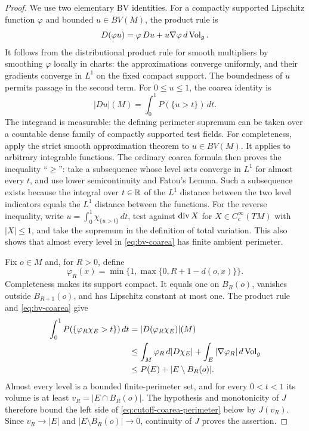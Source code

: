 \begin{proof}
We use two elementary BV identities. For a compactly supported
Lipschitz function $\varphi$ and bounded $u\in BV(M)$, the product rule is
\[
 D(\varphi u)=\varphi\,Du+u\nabla\varphi\,d\operatorname{Vol}_g.
\]
It follows from the distributional product rule for smooth multipliers
by smoothing $\varphi$ locally in charts: the approximations converge
uniformly, and their gradients converge in $L^1$ on the fixed compact
support. The boundedness of $u$ permits passage in the second term.
For $0\le u\le1$, the coarea identity is
\begin{equation}\label{eq:bv-coarea}
 |Du|(M)=\int_0^1P(\{u>t\})\,dt.
\end{equation}
The integrand is measurable: the defining perimeter supremum can be
taken over a countable dense family of compactly supported test fields.
For completeness, apply the strict smooth approximation theorem
\cite[Theorem~2.12 in the author preprint]{GuneysuPallara2015} to
$u\in BV(M)$. It applies to arbitrary integrable functions.
The ordinary coarea formula then proves the inequality ``$\ge$'': take a subsequence whose
level sets converge in $L^1$ for almost every $t$, and use lower
semicontinuity and Fatou's Lemma. Such a subsequence exists because
the integral over $t\in\mathbb R$ of the $L^1$ distance between the two level
indicators equals the $L^1$ distance between the functions. For the
reverse inequality, write $u=\int_0^1\chi_{\{u>t\}}\,dt$, test against
$\operatorname{div} X$ for $X\in C_c^\infty(TM)$ with $|X|\le1$, and take the supremum
in the definition of total variation. This also shows that almost every
level in \eqref{eq:bv-coarea} has finite ambient perimeter.

Fix $o\in M$ and, for $R>0$, define
\[
 \varphi_R(x)=\min\{1,\max\{0,R+1-d(o,x)\}\}.
\]
Completeness makes its support compact. It equals one on $B_R(o)$,
vanishes outside $B_{R+1}(o)$, and has Lipschitz constant at most one.
The product rule and \eqref{eq:bv-coarea} give
\begin{equation}\label{eq:cutoff-coarea-perimeter}
 \begin{split}
 \int_0^1P(\{\varphi_R\chi_E>t\})\,dt
 &=|D(\varphi_R\chi_E)|(M)\\
 &\le\int_M\varphi_R\,d|D\chi_E|
       +\int_E|\nabla\varphi_R|\,d\operatorname{Vol}_g\\
 &\le P(E)+|E\setminus B_R(o)|.
 \end{split}
\end{equation}
Almost every level is a bounded finite-perimeter set, and for every
$0<t<1$ its volume is at least $v_R=|E\cap B_R(o)|$. The hypothesis
and monotonicity of $J$ therefore bound the left side of
\eqref{eq:cutoff-coarea-perimeter} below by $J(v_R)$.
Since $v_R\to|E|$ and $|E\setminus B_R(o)|\to0$, continuity of $J$
proves the assertion.
\end{proof}

